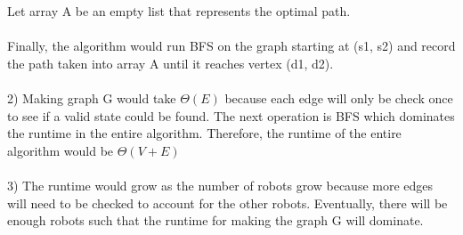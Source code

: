 \documentclass[12pt, a4paper]{article}
\begin{document}
Let array A be an empty list that represents the optimal path.
\\
\\
Finally, the algorithm would run BFS on the graph starting at (s1, s2) and record the path taken into array A until it reaches vertex (d1, d2).
\\
\\
2) Making graph G would take $\Theta(E)$ because each edge will only be check once to see if a valid state could be found.
The next operation is BFS which dominates the runtime in the entire algorithm.
Therefore, the runtime of the entire algorithm would be $\Theta(V + E)$
\\
\\
3) The runtime would grow as the number of robots grow because more edges will need to be checked to account for the other robots.
Eventually, there will be enough robots such that the runtime for making the graph G will dominate.
\\
\end{document}
